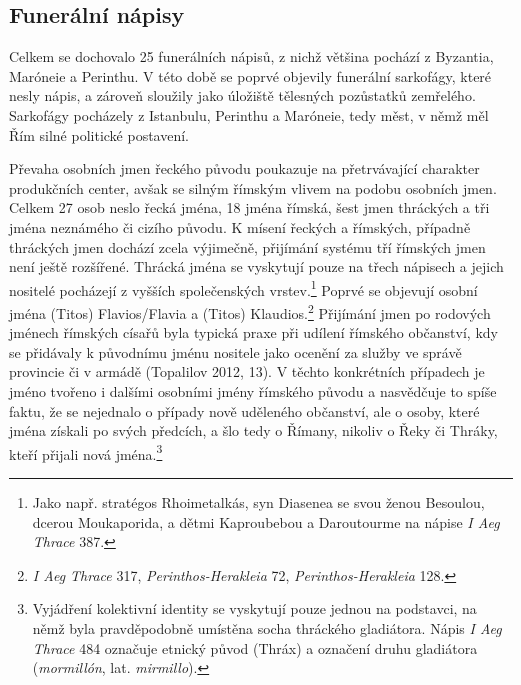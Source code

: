 \subsection[funerální-nápisy-11]{Funerální nápisy}

Celkem se dochovalo 25 funerálních nápisů, z nichž většina pochází z Byzantia, Maróneie a Perinthu. V této době se poprvé objevily funerální sarkofágy, které nesly nápis, a zároveň sloužily jako úložiště tělesných pozůstatků zemřelého. Sarkofágy pocházely z Istanbulu, Perinthu a Maróneie, tedy měst, v němž měl Řím silné politické postavení.

Převaha osobních jmen řeckého původu poukazuje na přetrvávající charakter produkčních center, avšak se silným římským vlivem na podobu osobních jmen. Celkem 27 osob neslo řecká jména, 18 jména římská, šest jmen thráckých a tři jména neznámého či cizího původu. K mísení řeckých a římských, případně thráckých jmen dochází zcela výjimečně, přijímání systému tří římských jmen není ještě rozšířené. Thrácká jména se vyskytují pouze na třech nápisech a jejich nositelé pocházejí z vyšších společenských vrstev.\footnote{Jako např. stratégos Rhoimetalkás, syn Diasenea se svou ženou Besoulou, dcerou Moukaporida, a dětmi Kaproubebou a Daroutourme na nápise {\em I Aeg Thrace} 387.} Poprvé se objevují osobní jména (Titos) Flavios/Flavia a (Titos) Klaudios.\footnote{{\em I Aeg Thrace} 317, {\em Perinthos-Herakleia} 72, {\em Perinthos-Herakleia} 128.} Přijímání jmen po rodových jménech římských císařů byla typická praxe při udílení římského občanství, kdy se přidávaly k původnímu jménu nositele jako ocenění za služby ve správě provincie či v armádě (Topalilov 2012, 13). V těchto konkrétních případech je jméno tvořeno i dalšími osobními jmény římského původu a nasvědčuje to spíše faktu, že se nejednalo o případy nově uděleného občanství, ale o osoby, které jména získali po svých předcích, a šlo tedy o Římany, nikoliv o Řeky či Thráky, kteří přijali nová jména.\footnote{Vyjádření kolektivní identity se vyskytují pouze jednou na podstavci, na němž byla pravděpodobně umístěna socha thráckého gladiátora. Nápis {\em I Aeg Thrace} 484 označuje etnický původ (Thráx) a označení druhu gladiátora ({\em mormillón}, lat. {\em mirmillo}).}

